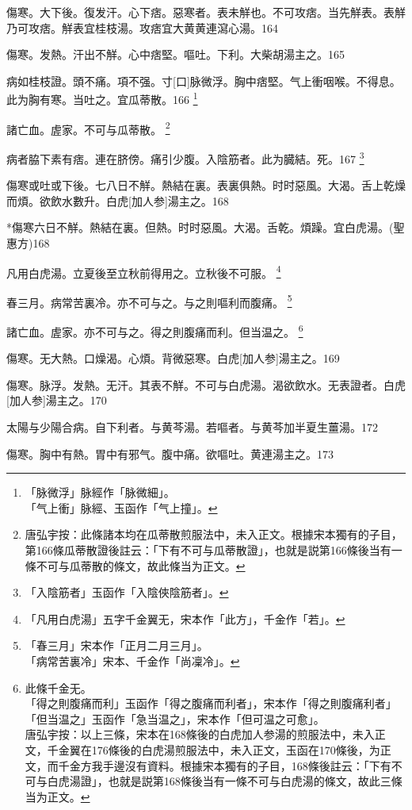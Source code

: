 \documentclass[12pt,twoside,UTF8,b5paper]{ctexbook}
\begin{document}
傷寒。大下後。復发汗。心下痞。惡寒者。表未觧也。不可攻痞。当先觧表。表觧乃可攻痞。觧表宜桂枝湯。攻痞宜大黄黄連瀉心湯。164

傷寒。发熱。汗出不觧。心中痞堅。嘔吐。下利。大柴胡湯主之。165

病如桂枝證。頭不痛。項不强。寸[口]脉微浮。胸中痞堅。气上衝咽喉。不得息。此为胸有寒。当吐之。宜瓜蒂散。166
	\footnote{「脉微浮」脉經作「脉微細」。\\「气上衝」脉經、玉函作「气上撞」。}

諸亡血。虗家。不可与瓜蒂散。
	\footnote{唐弘宇按：此條諸本均在瓜蒂散煎服法中，未入正文。根據宋本獨有的子目，第166條瓜蒂散證後註云：「下有不可与瓜蒂散證」，也就是説第166條後当有一條不可与瓜蒂散的條文，故此條当为正文。}

病者脇下素有痞。連在脐傍。痛引少腹。入陰筋者。此为臓結。死。167
	\footnote{「入陰筋者」玉函作「入陰俠陰筋者」。}

傷寒或吐或下後。七八日不觧。熱結在裏。表裏俱熱。时时惡風。大渴。舌上乾燥而煩。欲飲水數升。白虎[加人参]湯主之。168

*傷寒六日不觧。熱結在裏。但熱。时时惡風。大渴。舌乾。煩躁。宜白虎湯。(聖惠方)168

凡用白虎湯。立夏後至立秋前得用之。立秋後不可服。
	\footnote{「凡用白虎湯」五字千金翼无，宋本作「此方」，千金作「若」。}

春三月。病常苦裏冷。亦不可与之。与之則嘔利而腹痛。
	\footnote{「春三月」宋本作「正月二月三月」。\\「病常苦裏冷」宋本、千金作「尚凜冷」。}

諸亡血。虗家。亦不可与之。得之則腹痛而利。但当温之。
	\footnote{此條千金无。\\「得之則腹痛而利」玉函作「得之腹痛而利者」，宋本作「得之則腹痛利者」\\「但当温之」玉函作「急当温之」，宋本作「但可温之可愈」。\\唐弘宇按：以上三條，宋本在168條後的白虎加人参湯的煎服法中，未入正文，千金翼在176條後的白虎湯煎服法中，未入正文，玉函在170條後，为正文，而千金方我手邊沒有資料。根據宋本獨有的子目，168條後註云：「下有不可与白虎湯證」，也就是説第168條後当有一條不可与白虎湯的條文，故此三條当为正文。}

傷寒。无大熱。口燥渴。心煩。背微惡寒。白虎[加人参]湯主之。169

傷寒。脉浮。发熱。无汗。其表不觧。不可与白虎湯。渴欲飲水。无表證者。白虎[加人参]湯主之。170

太陽与少陽合病。自下利者。与黄芩湯。若嘔者。与黄芩加半夏生薑湯。172

傷寒。胸中有熱。胃中有邪气。腹中痛。欲嘔吐。黄連湯主之。173
\end{document}
